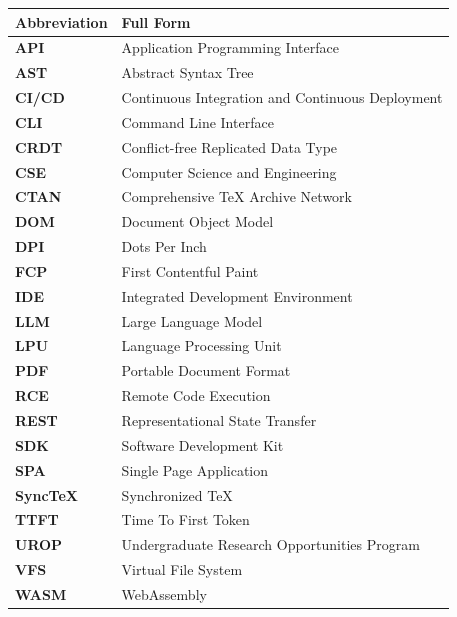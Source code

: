 \documentclass[12pt,a4paper]{article}
\begin{document}
\renewcommand{\arraystretch}{1.3}
\noindent
\begin{tabularx}{\textwidth}{@{}>{\bfseries}p{}L@{}}
\toprule
\textbf{Abbreviation} & \textbf{Full Form} \\
\midrule
API & Application Programming Interface \\
AST & Abstract Syntax Tree \\
CI/CD & Continuous Integration and Continuous Deployment \\
CLI & Command Line Interface \\
CRDT & Conflict-free Replicated Data Type \\
CSE & Computer Science and Engineering \\
CTAN & Comprehensive \TeX{} Archive Network \\
DOM & Document Object Model \\
DPI & Dots Per Inch \\
FCP & First Contentful Paint \\
IDE & Integrated Development Environment \\
LLM & Large Language Model \\
LPU & Language Processing Unit \\
PDF & Portable Document Format \\
RCE & Remote Code Execution \\
REST & Representational State Transfer \\
SDK & Software Development Kit \\
SPA & Single Page Application \\
Sync\TeX & Synchronized \TeX{} \\
TTFT & Time To First Token \\
UROP & Undergraduate Research Opportunities Program \\
VFS & Virtual File System \\
WASM & WebAssembly \\
\bottomrule
\end{tabularx}
\renewcommand{\arraystretch}{1}

\clearpage
{}
{}
\renewcommand{\listfigurename}{List of Figures}
\listoffigures

\vspace{18pt}
{}
\renewcommand{\listtablename}{List of Tables}
\listoftables
\end{document}
